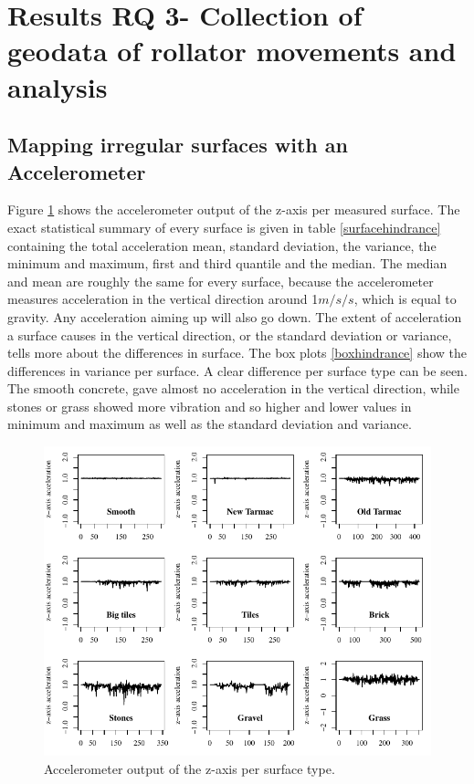 \clearpage

\section{Results RQ 3- Collection of geodata of rollator movements and analysis}\label{Rrq2b}
\subsection{Mapping irregular surfaces with an Accelerometer}
Figure \ref{figsurfaces} shows the accelerometer output of the z-axis per measured surface. The exact statistical summary of every surface is given in table \ref{surfacehindrance} containing the total acceleration mean, standard deviation, the variance, the minimum and maximum, first and third quantile and the median. The median and mean are roughly the same for every surface, because the accelerometer measures acceleration in the vertical direction around 1$m/s/s$, which is equal to gravity. Any acceleration aiming up will also go down. The extent of acceleration a surface causes in the vertical direction, or the standard deviation or variance, tells more about the differences in surface.
The box plots \ref{boxhindrance} show the differences in variance per surface. A clear difference per surface type can be seen. The smooth concrete, gave almost no acceleration in the vertical direction, while stones or grass showed more vibration and so higher and lower values in minimum and maximum as well as the standard deviation and variance. 

\begin{figure}[H]
\includegraphics[width=\textwidth]{img/R_AllsurfaceGraphs.pdf}
\centering
\caption{Accelerometer output of the z-axis per surface type.\label{figsurfaces}}
\end{figure} 

